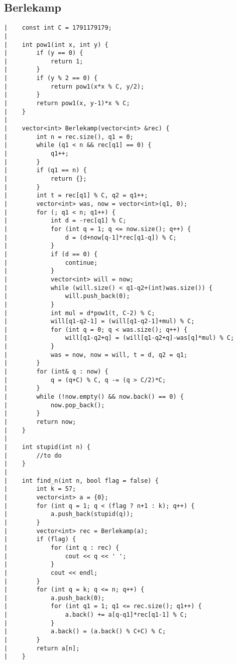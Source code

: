 \documentclass[a4paper, 10pt]{article}
\begin{document}
\begin{center}
\section*{Berlekamp}
\begin{verbatim}
|    const int C = 1791179179;
|    
|    int pow1(int x, int y) {
|        if (y == 0) {
|            return 1;
|        }
|        if (y % 2 == 0) {
|            return pow1(x*x % C, y/2);
|        }
|        return pow1(x, y-1)*x % C;
|    }
|    
|    vector<int> Berlekamp(vector<int> &rec) {
|        int n = rec.size(), q1 = 0;
|        while (q1 < n && rec[q1] == 0) {
|            q1++;
|        }
|        if (q1 == n) {
|            return {};
|        }
|        int t = rec[q1] % C, q2 = q1++;
|        vector<int> was, now = vector<int>(q1, 0);
|        for (; q1 < n; q1++) {
|            int d = -rec[q1] % C;
|            for (int q = 1; q <= now.size(); q++) {
|                d = (d+now[q-1]*rec[q1-q]) % C;
|            }
|            if (d == 0) {
|                continue;
|            }
|            vector<int> will = now;
|            while (will.size() < q1-q2+(int)was.size()) {
|                will.push_back(0);
|            }
|            int mul = d*pow1(t, C-2) % C;
|            will[q1-q2-1] = (will[q1-q2-1]+mul) % C;
|            for (int q = 0; q < was.size(); q++) {
|                will[q1-q2+q] = (will[q1-q2+q]-was[q]*mul) % C;
|            }
|            was = now, now = will, t = d, q2 = q1;
|        }
|        for (int& q : now) {
|            q = (q+C) % C, q -= (q > C/2)*C;
|        }
|        while (!now.empty() && now.back() == 0) {
|            now.pop_back();
|        }
|        return now;
|    }
|    
|    int stupid(int n) {
|        //to do
|    }
|    
|    int find_n(int n, bool flag = false) {
|        int k = 57;
|        vector<int> a = {0};
|        for (int q = 1; q < (flag ? n+1 : k); q++) {
|            a.push_back(stupid(q));
|        }
|        vector<int> rec = Berlekamp(a);
|        if (flag) {
|            for (int q : rec) {
|                cout << q << ' ';
|            }
|            cout << endl;
|        }
|        for (int q = k; q <= n; q++) {
|            a.push_back(0);
|            for (int q1 = 1; q1 <= rec.size(); q1++) {
|                a.back() += a[q-q1]*rec[q1-1] % C;
|            }
|            a.back() = (a.back() % C+C) % C;
|        }
|        return a[n];
|    }
\end{verbatim}


\end{center}
\end{document}
